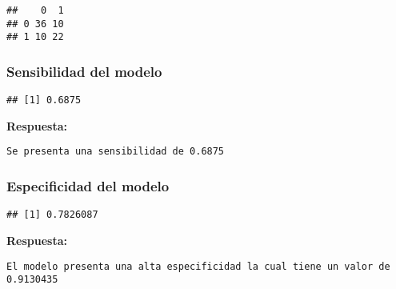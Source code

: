 \documentclass[
]{article}
\newenvironment{Shaded}{\begin{snugshade}}{\end{snugshade}}
\newcommand{\FunctionTok}[1]{\textcolor[rgb]{0.00,0.00,0.00}{#1}}
\newcommand{\NormalTok}[1]{#1}
\newcommand{\SpecialCharTok}[1]{\textcolor[rgb]{0.00,0.00,0.00}{#1}}
\begin{document}
\begin{verbatim}
##    0  1
## 0 36 10
## 1 10 22
\end{verbatim}

\hypertarget{sensibilidad-del-modelo}{%
\subsubsection{Sensibilidad del modelo}\label{sensibilidad-del-modelo}}

\begin{Shaded}
\end{Shaded}

\begin{verbatim}
## [1] 0.6875
\end{verbatim}

\textbf{Respuesta:}

\begin{verbatim}
Se presenta una sensibilidad de 0.6875
\end{verbatim}

\hypertarget{especificidad-del-modelo}{%
\subsubsection{Especificidad del
modelo}\label{especificidad-del-modelo}}

\begin{Shaded}
\end{Shaded}

\begin{verbatim}
## [1] 0.7826087
\end{verbatim}

\textbf{Respuesta:}

\begin{verbatim}
El modelo presenta una alta especificidad la cual tiene un valor de 0.9130435
\end{verbatim}
\end{document}
